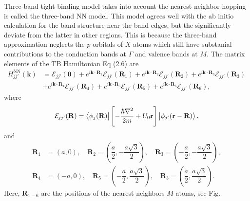 \documentclass{report}
\newcommand{\f}[2]{\dfrac{#1}{#2}}
\begin{document}
Three-band tight binding model takes into account the nearest neighbor hopping is called the three-band \ac{NN} model. This model agrees well with the ab initio calculation for the band structure near the band edges, but the significantly deviate from the latter in other regions. This is because the three-band approximation neglects the $p$ orbitals of $X$ atoms which still have substanial contributions to the conduction bands at $\Gamma$ and valence bands at $M$. The matrix elements of the TB Hamiltonian Eq (2.6) are
\begin{equation}
	\begin{aligned}
		H_{jj'}^{\text{NN}}(\mathbf{k})
		 & = \mathcal{E}_{jj'}(\mathbf{0}) + e^{i\mathbf{k}\cdot \mathbf{R}_{1}}\mathcal{E}_{jj'}(\mathbf{R}_{1}) + e^{i\mathbf{k}\cdot \mathbf{R}_{2}}\mathcal{E}_{jj'}(\mathbf{R}_{2}) + e^{i\mathbf{k}\cdot \mathbf{R}_{3}}\mathcal{E}_{jj'}(\mathbf{R}_{3}) \\
		 & + e^{i\mathbf{k}\cdot \mathbf{R}_{4}}\mathcal{E}_{jj'}(\mathbf{R}_{4}) + e^{i\mathbf{k}\cdot \mathbf{R}_{5}}\mathcal{E}_{jj'}(\mathbf{R}_{5}) + e^{i\mathbf{k}\cdot \mathbf{R}_{6}}\mathcal{E}_{jj'}(\mathbf{R}_{6}),
	\end{aligned}
\end{equation}
where
\begin{gather}
	\mathcal{E}_{jj'}(\mathbf{R}) = \bra{\phi_{j}(\mathbf{R})} \left[-\frac{\hbar \nabla^{2}}{2m} + U_{0} \mathbf{r}\right] \ket{\phi_{j'}(\mathbf{r-R})},
\end{gather}
and
\begin{equation}
	\begin{aligned}
		\mathbf{R}_{1} & = (a,0), \quad \mathbf{R}_{2} = \left(\f{a}{2}, - \f{a\sqrt{3}}{2}\right), \quad \mathbf{R}_{3} = \left(-\f{a}{2},-\f{a\sqrt{3}}{2}\right), \\
		\mathbf{R}_{4} & = (-a,0), \quad \mathbf{R}_{5} = \left(-\f{a}{2}, \f{a\sqrt{3}}{2}\right), \quad \mathbf{R}_{3} = \left(\f{a}{2},\f{a\sqrt{3}}{2}\right).
	\end{aligned}
\end{equation}
Here, $\mathbf{R}_{1-6}$ are the positions of the nearest neighbors $M$ atoms, see Fig.
\end{document}
